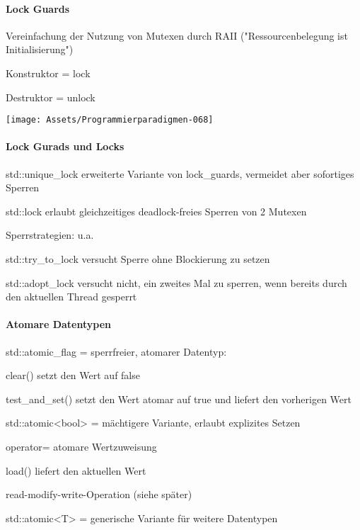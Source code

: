 \documentclass[10pt]{article}
\begin{document}
\paragraph{Lock Guards}
\begin{itemize*}
  \item Vereinfachung der Nutzung von Mutexen durch RAII ("Ressourcenbelegung ist Initialisierung")
  \item Konstruktor = lock
  \item Destruktor = unlock
\end{itemize*}
\begin{center}
  \texttt{[image: Assets/Programmierparadigmen-068]}
\end{center}

\paragraph{Lock Gurads und Locks}
\begin{itemize*}
  \item std::unique\_lock erweiterte Variante von lock\_guards, vermeidet aber sofortiges Sperren
  \item std::lock erlaubt gleichzeitiges deadlock-freies Sperren von 2 Mutexen
  \item Sperrstrategien: u.a.
  \begin{itemize*}
    \item std::try\_to\_lock versucht Sperre ohne Blockierung zu setzen
    \item std::adopt\_lock versucht nicht, ein zweites Mal zu sperren, wenn bereits durch den aktuellen Thread gesperrt
  \end{itemize*}
\end{itemize*}

\paragraph{Atomare Datentypen}
\begin{itemize*}
  \item std::atomic\_flag = sperrfreier, atomarer Datentyp:
  \begin{itemize*}
    \item clear() setzt den Wert auf false
    \item test\_and\_set() setzt den Wert atomar auf true und liefert den vorherigen Wert
  \end{itemize*}
  \item std::atomic<bool> = mächtigere Variante, erlaubt explizites Setzen
  \begin{itemize*}
    \item operator= atomare Wertzuweisung
    \item load() liefert den aktuellen Wert
    \item read-modify-write-Operation (siehe später)
  \end{itemize*}
  \item std::atomic<T> = generische Variante für weitere Datentypen
\end{itemize*}
\end{document}

